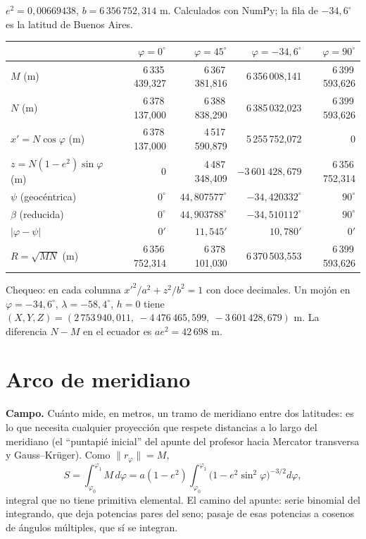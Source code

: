 \begin{resultado}[Valores de control en GRS80 (\(a=6\,378\,137\) m, \(f=1/298{,}257222101\))]
\(e^2=0{,}00669438\), \(b=6\,356\,752{,}314\) m. Calculados con NumPy; la fila de
\(-34{,}6^\circ\) es la latitud de Buenos Aires.

{\small
\begin{center}
\begin{tabular}{l rrrr}
\toprule
 & \(\varphi=0^\circ\) & \(\varphi=45^\circ\) & \(\varphi=-34{,}6^\circ\) & \(\varphi=90^\circ\)\\
\midrule
\(M\) (m) & 6\,335\,439{,}327 & 6\,367\,381{,}816 & 6\,356\,008{,}141 & 6\,399\,593{,}626\\
\(N\) (m) & 6\,378\,137{,}000 & 6\,388\,838{,}290 & 6\,385\,032{,}023 & 6\,399\,593{,}626\\
\(x'=N\cos\varphi\) (m) & 6\,378\,137{,}000 & 4\,517\,590{,}879 & 5\,255\,752{,}072 & 0\\
\(z=N(1-e^2)\sin\varphi\) (m) & 0 & 4\,487\,348{,}409 & \(-3\,601\,428{,}679\) & 6\,356\,752{,}314\\
\(\psi\) (geocéntrica) & \(0^\circ\) & \(44{,}807577^\circ\) & \(-34{,}420332^\circ\) & \(90^\circ\)\\
\(\beta\) (reducida) & \(0^\circ\) & \(44{,}903788^\circ\) & \(-34{,}510112^\circ\) & \(90^\circ\)\\
\(|\varphi-\psi|\) & \(0'\) & \(11{,}545'\) & \(10{,}780'\) & \(0'\)\\
\(R=\sqrt{MN}\) (m) & 6\,356\,752{,}314 & 6\,378\,101{,}030 & 6\,370\,503{,}553 & 6\,399\,593{,}626\\
\bottomrule
\end{tabular}
\end{center}
}

Chequeo: en cada columna \(x'^2/a^2+z^2/b^2=1\) con doce decimales. Un mojón en
\(\varphi=-34{,}6^\circ\), \(\lambda=-58{,}4^\circ\), \(h=0\) tiene
\((X,Y,Z)=(2\,753\,940{,}011,\ -4\,476\,465{,}599,\ -3\,601\,428{,}679)\) m. La diferencia
\(N-M\) en el ecuador es \(ae^2=42\,698\) m.
\end{resultado}

\section{Arco de meridiano}\label{sec:arco-meridiano}

\textbf{Campo.} Cuánto mide, en metros, un tramo de meridiano entre dos latitudes: es lo
que necesita cualquier proyección que respete distancias a lo largo del meridiano (el
``puntapié inicial'' del apunte del profesor hacia Mercator transversa y Gauss--Krüger).
Como \(\|r_\varphi\|=M\),
\[
  S=\int_{\varphi_0}^{\varphi_1}M\,d\varphi
  =a(1-e^2)\int_{\varphi_0}^{\varphi_1}\bigl(1-e^2\sin^2\varphi\bigr)^{-3/2}d\varphi ,
\]
integral que no tiene primitiva elemental. El camino del apunte: serie binomial del
integrando, que deja potencias pares del seno; pasaje de esas potencias a cosenos de
ángulos múltiples, que sí se integran.

